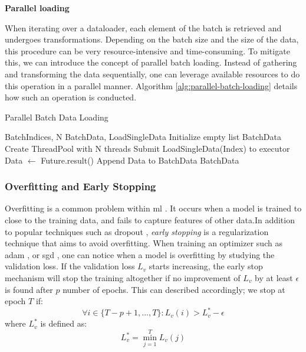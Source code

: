 {\textbf{Parallel loading}

When iterating over a dataloader, each element of the batch is retrieved and undergoes transformations. Depending on the batch size and  the size of the data, this procedure can be very resource-intensive and time-consuming. To mitigate this, we can introduce the concept of parallel batch loading. Instead of gathering and transforming the data sequentially, one can leverage available resources to do this operation in a parallel manner. Algorithm \ref{alg:parallel-batch-loading} details how such an operation is conducted.


\begin{algorithm}
\caption{Parallel Batch Data Loading}\label{alg:parallel-batch-loading}
\begin{algorithmic}
\Require BatchIndices, N
\Ensure BatchData, LoadSingleData
\State Initialize empty list BatchData
\State Create ThreadPool with N threads
    \State Submit LoadSingleData(Index) to executor
\EndFor
{}
    \State Data $\gets$ Future.result()
    \State Append Data to BatchData
\EndFor
\State \Return BatchData
\end{algorithmic}
\end{algorithm}
}

\subsubsection{Overfitting and Early Stopping}

Overfitting is a common problem within \acrlong{ml} \cite{srivastava2014dropout}. It occurs when a model is trained to close to the training data, and fails to capture features of other data.In addition to popular techniques such as dropout \cite{srivastava2014dropout}, \textit{early stopping} is a regularization technique that aims to avoid overfitting. When training an optimizer such as \acrshort{adam} \cite{kingma2017adam}, or \acrshort{sgd} , one can notice when a model is overfitting by studying the validation loss. If the validation loss $L_v$ starts increasing, the early stop mechanism will stop the training altogether if no improvement of $L_v$ by at least $\epsilon$ is found after $p$ number of epochs. This can described accordingly; we stop at epoch $T$ if:
\begin{equation}
\forall i \in \{T-p+1, ..., T\}: L_v(i) > L_v^* - \epsilon
\end{equation}
where $L_v^*$ is defined as:
\begin{equation}
L_v^* = \min_{j=1}^{T} L_v(j)
\end{equation}

